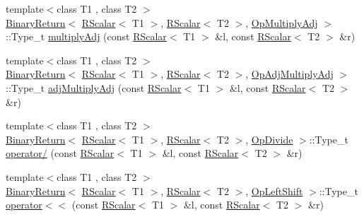 \begin{DoxyCompactItemize}
\item 
{\footnotesize template$<$class T1 , class T2 $>$ }\\\mbox{\hyperlink{structENSEM_1_1BinaryReturn}{Binary\+Return}}$<$ \mbox{\hyperlink{classENSEM_1_1RScalar}{R\+Scalar}}$<$ T1 $>$, \mbox{\hyperlink{classENSEM_1_1RScalar}{R\+Scalar}}$<$ T2 $>$, \mbox{\hyperlink{structENSEM_1_1OpMultiplyAdj}{Op\+Multiply\+Adj}} $>$\+::Type\+\_\+t \mbox{\hyperlink{group__rscalar_ga5b26c70325ac5d320cfd53d629b3d0c4}{multiply\+Adj}} (const \mbox{\hyperlink{classENSEM_1_1RScalar}{R\+Scalar}}$<$ T1 $>$ \&l, const \mbox{\hyperlink{classENSEM_1_1RScalar}{R\+Scalar}}$<$ T2 $>$ \&r)
\item 
{\footnotesize template$<$class T1 , class T2 $>$ }\\\mbox{\hyperlink{structENSEM_1_1BinaryReturn}{Binary\+Return}}$<$ \mbox{\hyperlink{classENSEM_1_1RScalar}{R\+Scalar}}$<$ T1 $>$, \mbox{\hyperlink{classENSEM_1_1RScalar}{R\+Scalar}}$<$ T2 $>$, \mbox{\hyperlink{structENSEM_1_1OpAdjMultiplyAdj}{Op\+Adj\+Multiply\+Adj}} $>$\+::Type\+\_\+t \mbox{\hyperlink{group__rscalar_ga98ba0296fc190036d2587357efbd8ca2}{adj\+Multiply\+Adj}} (const \mbox{\hyperlink{classENSEM_1_1RScalar}{R\+Scalar}}$<$ T1 $>$ \&l, const \mbox{\hyperlink{classENSEM_1_1RScalar}{R\+Scalar}}$<$ T2 $>$ \&r)
\item 
{\footnotesize template$<$class T1 , class T2 $>$ }\\\mbox{\hyperlink{structENSEM_1_1BinaryReturn}{Binary\+Return}}$<$ \mbox{\hyperlink{classENSEM_1_1RScalar}{R\+Scalar}}$<$ T1 $>$, \mbox{\hyperlink{classENSEM_1_1RScalar}{R\+Scalar}}$<$ T2 $>$, \mbox{\hyperlink{structENSEM_1_1OpDivide}{Op\+Divide}} $>$\+::Type\+\_\+t \mbox{\hyperlink{group__rscalar_ga152c5f3a8197a5f6804ad19fc8987ed2}{operator/}} (const \mbox{\hyperlink{classENSEM_1_1RScalar}{R\+Scalar}}$<$ T1 $>$ \&l, const \mbox{\hyperlink{classENSEM_1_1RScalar}{R\+Scalar}}$<$ T2 $>$ \&r)
\item 
{\footnotesize template$<$class T1 , class T2 $>$ }\\\mbox{\hyperlink{structENSEM_1_1BinaryReturn}{Binary\+Return}}$<$ \mbox{\hyperlink{classENSEM_1_1RScalar}{R\+Scalar}}$<$ T1 $>$, \mbox{\hyperlink{classENSEM_1_1RScalar}{R\+Scalar}}$<$ T2 $>$, \mbox{\hyperlink{structENSEM_1_1OpLeftShift}{Op\+Left\+Shift}} $>$\+::Type\+\_\+t \mbox{\hyperlink{group__rscalar_ga6cce85d32b25e3574980320d6e6bd811}{operator$<$$<$}} (const \mbox{\hyperlink{classENSEM_1_1RScalar}{R\+Scalar}}$<$ T1 $>$ \&l, const \mbox{\hyperlink{classENSEM_1_1RScalar}{R\+Scalar}}$<$ T2 $>$ \&r)
\item 

\end{DoxyCompactItemize}
